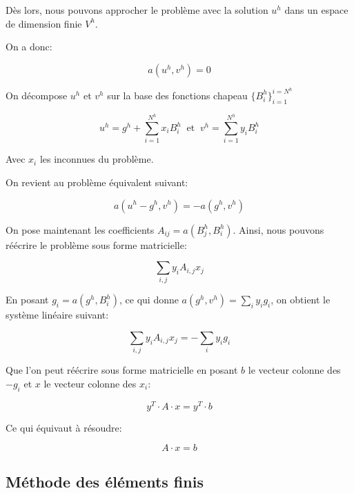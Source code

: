 \documentclass{article}
\begin{document}
Dès lors, nous pouvons approcher le problème avec la solution 
$u^h$ dans un espace de dimension finie $V^h$.

On a donc:

\begin{equation}
    a(u^h, v^h) = 0
\end{equation}

On décompose $u^h$ et $v^h$ sur la base des fonctions chapeau
$\{B^h_i\}^{i=N^h}_{i=1}$

\begin{equation}
    u^h = g^h + \sum_{i=1}^{N^h} x_i B^h_i
    \ \text{ et } \ v^h = \sum_{i=1}^{N^h} y_i B^h_i
\end{equation}

Avec $x_i$ les inconnues du problème.

On revient au problème équivalent suivant:

\begin{equation}
    a(u^h - g^h, v^h) = - a(g^h, v^h)
\end{equation}

On pose maintenant les coefficients $A_{ij} = a(B^h_j, B^h_i)$. Ainsi, nous pouvons
réécrire le problème sous forme matricielle:

\begin{equation}
    \sum_{i,j} y_i A_{i,j} x_j
\end{equation}

En posant $g_i = a(g^h, B^h_i)$, ce qui donne $a(g^h, v^h) = \sum_i y_i g_i$,
on obtient le système linéaire suivant:

\begin{equation}
    \sum_{i,j} y_i A_{i,j} x_j = - \sum_i y_i g_i
\end{equation}

Que l'on peut réécrire sous forme matricielle en posant $b$ le vecteur colonne
des $-g_i$ et $x$ le vecteur colonne des $x_i$:

\begin{equation}
    y^T \cdot A \cdot x =  y^T \cdot b
\end{equation}

Ce qui équivaut à résoudre:

\begin{equation}
    A \cdot x = b
\end{equation}

\subsection{Méthode des éléments finis}
\end{document}
